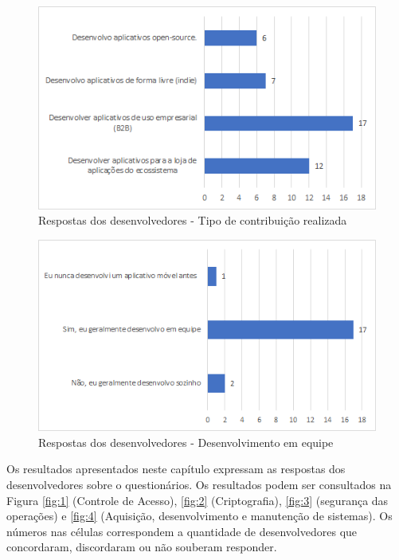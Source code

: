 \begin{figure}[H]
\centering
\includegraphics[scale=0.8]{fig/contribuicao.PNG}
\caption{Respostas dos desenvolvedores - Tipo de contribuição realizada}
\label{fig:contribuicao}
\end{figure}

\begin{figure}[H]
\vspace{1.8cm}
\centering
\includegraphics[scale=0.8]{fig/devjunto.png}
\caption{Respostas dos desenvolvedores - Desenvolvimento em equipe}
\label{fig:equipe}
\end{figure}

Os resultados apresentados neste capítulo expressam as respostas dos desenvolvedores sobre o questionários. Os resultados podem ser consultados na Figura \ref{fig:1} (Controle de Acesso), \ref{fig:2} (Criptografia), \ref{fig:3} (segurança das operações) e \ref{fig:4} (Aquisição, desenvolvimento e manutenção de sistemas). Os números nas células correspondem a quantidade de desenvolvedores que concordaram, discordaram ou não souberam responder.

